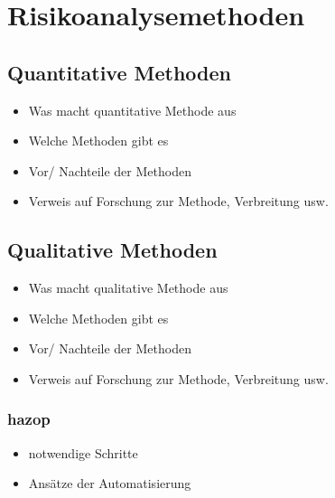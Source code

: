 \section{Risikoanalysemethoden}
\subsection{Quantitative Methoden}
\begin{itemize}
\item Was macht quantitative Methode aus
\item Welche Methoden gibt es
\item Vor/ Nachteile der Methoden
\item Verweis auf Forschung zur Methode, Verbreitung usw.
\end{itemize}
\subsection{Qualitative Methoden}
\begin{itemize}
\item Was macht qualitative Methode aus
\item Welche Methoden gibt es
\item Vor/ Nachteile der Methoden
\item Verweis auf Forschung zur Methode, Verbreitung usw.
\end{itemize}
  \subsubsection{\ac{hazop}}
  \begin{itemize}
  \item notwendige Schritte
  \item Ans\"atze der Automatisierung
  \end{itemize}